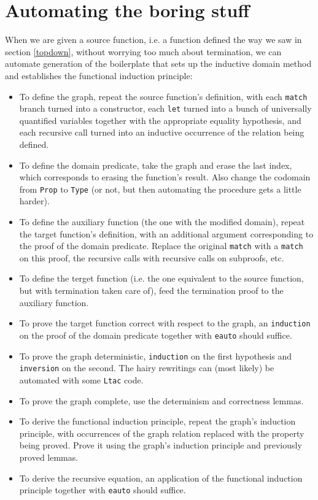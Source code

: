 \documentclass[declaration,mgr,english,shortabstract]{iithesis}
\newcommand{\m}[1]{\texttt{#1}}
\begin{document}
\section{Automating the boring stuff} \label{automate}

When we are given a source function, i.e. a function defined the way we saw in section \ref{topdown}, without worrying too much about termination, we can automate generation of the boilerplate that sets up the inductive domain method and establishes the functional induction principle:

\begin{itemize}
    \item To define the graph, repeat the source function's definition, with each \m{match} branch turned into a constructor, each \m{let} turned into a bunch of universally quantified variables together with the appropriate equality hypothesis, and each recursive call turned into an inductive occurrence of the relation being defined.
    \item To define the domain predicate, take the graph and erase the last index, which corresponds to erasing the function's result. Also change the codomain from \m{Prop} to \m{Type} (or not, but then automating the procedure gets a little harder).
    \item To define the auxiliary function (the one with the modified domain), repeat the target function's definition, with an additional argument corresponding to the proof of the domain predicate. Replace the original \m{match} with a \m{match} on this proof, the recursive calls with recursive calls on subproofs, etc.
    \item To define the terget function (i.e. the one equivalent to the source function, but with termination taken care of), feed the termination proof to the auxiliary function.
    \item To prove the target function correct with respect to the graph, an \m{induction} on the proof of the domain predicate together with \m{eauto} should suffice.
    \item To prove the graph deterministic, \m{induction} on the first hypothesis and \m{inversion} on the second. The hairy rewritings can (most likely) be automated with some \m{Ltac} code.
    \item To prove the graph complete, use the determinism and correctness lemmas.
    \item To derive the functional induction principle, repeat the graph's induction principle, with occurrences of the graph relation replaced with the property being proved. Prove it using the graph's induction principle and previously proved lemmas.
    \item To derive the recursive equation, an application of the functional induction principle together with \m{eauto} should suffice.
\end{itemize}
\end{document}
